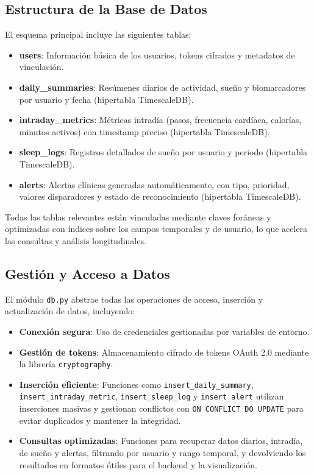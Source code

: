 \subsection{Estructura de la Base de Datos}
El esquema principal incluye las siguientes tablas:
\begin{itemize}
    \item \textbf{users}: Información básica de los usuarios, tokens cifrados y metadatos de vinculación.
    \item \textbf{daily\_summaries}: Resúmenes diarios de actividad, sueño y biomarcadores por usuario y fecha (hipertabla TimescaleDB).
    \item \textbf{intraday\_metrics}: Métricas intradía (pasos, frecuencia cardíaca, calorías, minutos activos) con timestamp preciso (hipertabla TimescaleDB).
    \item \textbf{sleep\_logs}: Registros detallados de sueño por usuario y periodo (hipertabla TimescaleDB).
    \item \textbf{alerts}: Alertas clínicas generadas automáticamente, con tipo, prioridad, valores disparadores y estado de reconocimiento (hipertabla TimescaleDB).
\end{itemize}
Todas las tablas relevantes están vinculadas mediante claves foráneas y optimizadas con índices sobre los campos temporales y de usuario, lo que acelera las consultas y análisis longitudinales.

\subsection{Gestión y Acceso a Datos}
El módulo \texttt{db.py} abstrae todas las operaciones de acceso, inserción y actualización de datos, incluyendo:
\begin{itemize}
    \item \textbf{Conexión segura}: Uso de credenciales gestionadas por variables de entorno.
    \item \textbf{Gestión de tokens}: Almacenamiento cifrado de tokens OAuth 2.0 mediante la librería \texttt{cryptography}.
    \item \textbf{Inserción eficiente}: Funciones como \texttt{insert\_daily\_summary}, \texttt{insert\_intraday\_metric}, \texttt{insert\_sleep\_log} y \texttt{insert\_alert} utilizan inserciones masivas y gestionan conflictos con \texttt{ON CONFLICT DO UPDATE} para evitar duplicados y mantener la integridad.
    \item \textbf{Consultas optimizadas}: Funciones para recuperar datos diarios, intradía, de sueño y alertas, filtrando por usuario y rango temporal, y devolviendo los resultados en formatos útiles para el backend y la visualización.
\end{itemize}


